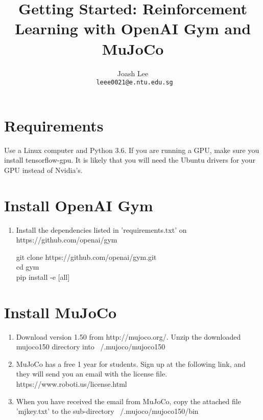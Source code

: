 \documentclass{article}
\title{Getting Started: Reinforcement Learning with OpenAI Gym and MuJoCo}
\author{
  Joash Lee\\
  \texttt{\ leee0021@e.ntu.edu.sg} \\
}
\DeclareRobustCommand{\mybox}[2][gray!20]{%
\begin{tcolorbox}[   %
        breakable,
        left=0pt,
        right=0pt,
        top=0pt,
        bottom=0pt,
        colback=#1,
        colframe=#1,
        width=\dimexpr\textwidth\relax, 
        enlarge left by=0mm,
        boxsep=5pt,
        arc=0pt,outer arc=0pt,
        ]
        #2
\end{tcolorbox}
}
\begin{document}
\maketitle

\section{Requirements}
Use a Linux computer and Python 3.6. If you are running a GPU, make sure you install tensorflow-gpu. It is likely that you will need the Ubuntu drivers for your GPU instead of Nvidia's.
\\
\section{Install OpenAI Gym}
\begin{enumerate}
\item Install the dependencies listed in 'requirements.txt' on https://github.com/openai/gym
\mybox{git clone https://github.com/openai/gym.git
\\ cd gym
\\ pip install -e [all]}
\end{enumerate}

\section{Install MuJoCo}
\begin{enumerate}
\item Download version 1.50 from http://mujoco.org/. Unzip the downloaded mujoco150 directory into ~/.mujoco/mujoco150

\item MuJoCo has a free 1 year for students. Sign up at the following link, and they will send you an email with the license file. https://www.roboti.us/license.html

\item When you have received the email from MuJoCo, copy the attached file 'mjkey.txt' to the sub-directory  ~/.mujoco/mujoco150/bin
\end{enumerate}
\end{document}
